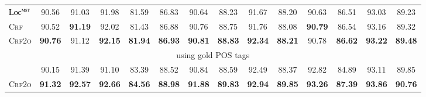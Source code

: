 \begin{table*}[tb]
\begin{tabularx}{\textwidth}{lccccccccccccc}
    $\textsc{Loc}^{\textsc{mst}}$     & 90.56          & 91.03          & 91.98                            & 81.59                           & 86.83                           & 90.64                            & 88.23                           & 91.67                            & 88.20                            & 90.63                           & 86.51                            & 93.03                            & 89.23                            \\
    \textsc{Crf}                      & 90.52          & \textbf{91.19} & 92.02                            & 81.43                           & 86.88\rlap{$^\dagger$}          & 90.76\rlap{$^\dagger$}           & 88.75                           & 91.76                            & 88.08                            & \textbf{90.79}                  & 86.54                            & 93.16\rlap{$^\ddagger$}          & 89.32\rlap{$^\ddagger$}          \\
    \textsc{Crf2o}                    & \textbf{90.76} & 91.12          & \textbf{92.15}\rlap{$^\ddagger$} & \textbf{81.94}                  & \textbf{86.93}\rlap{$^\dagger$} & \textbf{90.81}\rlap{$^\ddagger$} & \textbf{88.83}\rlap{$^\dagger$} & \textbf{92.34}\rlap{$^\ddagger$} & \textbf{88.21}\rlap{$^\dagger$}  & 90.78                           & \textbf{86.62}                   & \textbf{93.22}\rlap{$^\ddagger$} & \textbf{89.48}\rlap{$^\ddagger$} \\
    \multicolumn{14}{c}{using gold POS tags}                                                                                                                                                                                                                                                                                                                                                                                                                         \\[1pt]
    \citet{zhang-etal-2019-empirical} & 90.15          & 91.39          & 91.10                            & 83.39                           & 88.52                           & 90.84                            & 88.59                           & 92.49                            & 88.37                            & 92.82                           & 84.89                            & 93.11                            & 89.85                            \\
    \textsc{Crf2o}                    & \textbf{91.32} & \textbf{92.57} & \textbf{92.66}                   & \textbf{84.56}                  & \textbf{88.98}                  & \textbf{91.88}                   & \textbf{89.83}                  & \textbf{92.94}                   & \textbf{89.85}                   & \textbf{93.26}                  & \textbf{87.39}                   & \textbf{93.86}                   & \textbf{90.76}                   \\
    \bottomrule
  \end{tabularx}
  \label{table:ud-test}
\end{table*}

